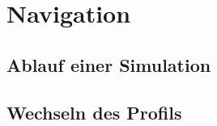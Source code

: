 \chapter{Navigation}
\label{chap:nav}

	\section{Ablauf einer Simulation}
	\label{sec:sim-ablauf}
	
	\section{Wechseln des Profils}
	\label{sec:change-prof}